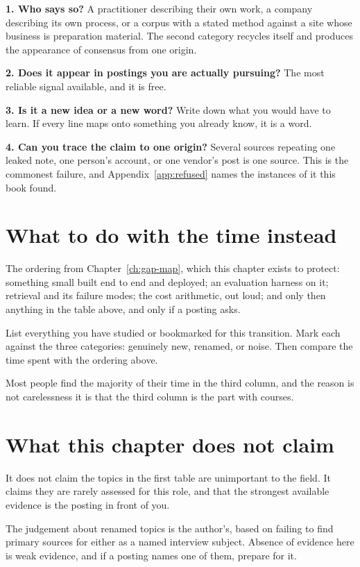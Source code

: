 \begin{kitmethod}
\textbf{1. Who says so?} A practitioner describing their own work, a company
describing its own process, or a corpus with a stated method \dash{} against a
site whose business is preparation material. The second category recycles
itself and produces the appearance of consensus from one origin.

\textbf{2. Does it appear in postings you are actually pursuing?} The most
reliable signal available, and it is free.

\textbf{3. Is it a new idea or a new word?} Write down what you would have to
learn. If every line maps onto something you already know, it is a word.

\textbf{4. Can you trace the claim to one origin?} Several sources repeating
one leaked note, one person's account, or one vendor's post is one source. This
is the commonest failure, and Appendix~\ref{app:refused} names the instances of
it this book found.
\end{kitmethod}


\section{What to do with the time instead}

The ordering from Chapter~\ref{ch:gap-map}, which this chapter exists to
protect: something small built end to end and deployed; an evaluation harness
on it; retrieval and its failure modes; the cost arithmetic, out loud; and only
then anything in the table above, and only if a posting asks.

\begin{drill}
List everything you have studied or bookmarked for this transition. Mark each
against the three categories: genuinely new, renamed, or noise. Then compare
the time spent with the ordering above.

Most people find the majority of their time in the third column, and the
reason is not carelessness \dash{} it is that the third column is the part with
courses.
\end{drill}

\section*{What this chapter does not claim}

It does not claim the topics in the first table are unimportant to the field.
It claims they are rarely assessed for this role, and that the strongest
available evidence is the posting in front of you.

The judgement about renamed topics is the author's, based on failing to find
primary sources for either as a named interview subject. Absence of evidence
here is weak evidence, and if a posting names one of them, prepare for it.
